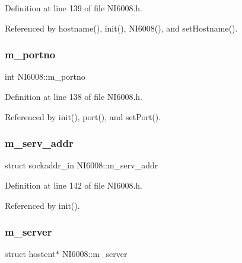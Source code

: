 Definition at line 139 of file N\+I6008.\+h.



Referenced by hostname(), init(), N\+I6008(), and set\+Hostname().

\mbox{\label{classNI6008_aabb914d00c938a12e99c1078f40fb104}} 
\subsubsection{\texorpdfstring{m\+\_\+portno}{m\_portno}}
{\footnotesize\ttfamily int N\+I6008\+::m\+\_\+portno\hspace{0.3cm}{\ttfamily [protected]}}



Definition at line 138 of file N\+I6008.\+h.



Referenced by init(), port(), and set\+Port().

\mbox{\label{classNI6008_a5bc7b74f001b1d5a3934d58eadb0b3fa}} 
\subsubsection{\texorpdfstring{m\+\_\+serv\+\_\+addr}{m\_serv\_addr}}
{\footnotesize\ttfamily struct sockaddr\+\_\+in N\+I6008\+::m\+\_\+serv\+\_\+addr\hspace{0.3cm}{\ttfamily [protected]}}



Definition at line 142 of file N\+I6008.\+h.



Referenced by init().

\mbox{\label{classNI6008_a789147ad3c7b66da3548a10a109f8cab}} 
\subsubsection{\texorpdfstring{m\+\_\+server}{m\_server}}
{\footnotesize\ttfamily struct hostent$\ast$ N\+I6008\+::m\+\_\+server\hspace{0.3cm}{\ttfamily [protected]}}




